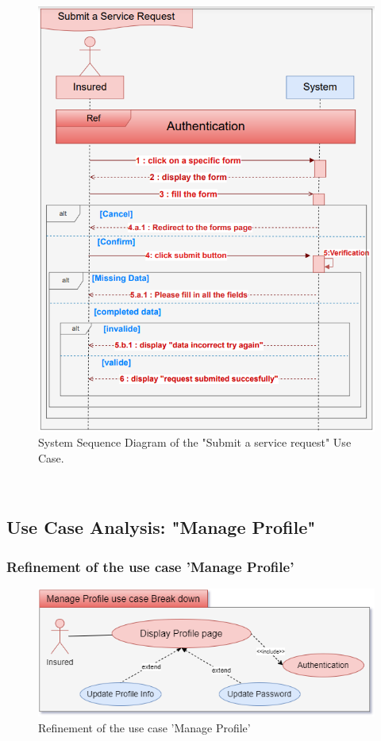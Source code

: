 \begin{figure}[h!]
    \centering
    \includegraphics[width=1\textwidth]{figures/seqSubmits_service_request.png}
    \caption{System Sequence Diagram of the "Submit a service request" Use Case.}
\end{figure}\
\clearpage


\subsection{Use Case Analysis: "Manage Profile"}
\subsubsection{Refinement of the use case 'Manage Profile'}
\begin{figure}[h!]
    \centering
    \includegraphics[width=1\textwidth]{figures/bd_manage_profile.png}
    \caption{Refinement of the use case 'Manage Profile'}
\end{figure}\


